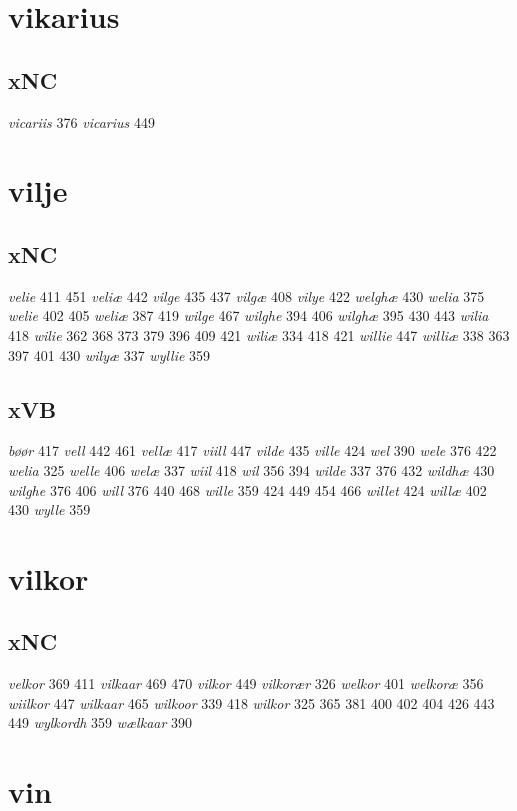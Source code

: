 \documentclass[a4paper,twocolumn]{article}
\begin{document}
\section{vikarius}
\label{sec:org10a47e7}
\subsection{xNC}
\label{sec:org14430ad}
\emph{vicariis} 376 \emph{vicarius} 449 
\section{vilje}
\label{sec:org9600dae}
\subsection{xNC}
\label{sec:orgcb5b769}
\emph{velie} 411 451 \emph{veliæ} 442 \emph{vilge} 435 437 \emph{vilgæ} 408 \emph{vilye} 422 \emph{welghæ} 430 \emph{welia} 375 \emph{welie} 402 405 \emph{weliæ} 387 419 \emph{wilge} 467 \emph{wilghe} 394 406 \emph{wilghæ} 395 430 443 \emph{wilia} 418 \emph{wilie} 362 368 373 379 396 409 421 \emph{wiliæ} 334 418 421 \emph{willie} 447 \emph{williæ} 338 363 397 401 430 \emph{wilyæ} 337 \emph{wyllie} 359 
\subsection{xVB}
\label{sec:org5499669}
\emph{bøør} 417 \emph{vell} 442 461 \emph{vellæ} 417 \emph{viill} 447 \emph{vilde} 435 \emph{ville} 424 \emph{wel} 390 \emph{wele} 376 422 \emph{welia} 325 \emph{welle} 406 \emph{welæ} 337 \emph{wiil} 418 \emph{wil} 356 394 \emph{wilde} 337 376 432 \emph{wildhæ} 430 \emph{wilghe} 376 406 \emph{will} 376 440 468 \emph{wille} 359 424 449 454 466 \emph{willet} 424 \emph{willæ} 402 430 \emph{wylle} 359 
\section{vilkor}
\label{sec:org45bff07}
\subsection{xNC}
\label{sec:orgfae1070}
\emph{velkor} 369 411 \emph{vilkaar} 469 470 \emph{vilkor} 449 \emph{vilkorær} 326 \emph{welkor} 401 \emph{welkoræ} 356 \emph{wiilkor} 447 \emph{wilkaar} 465 \emph{wilkoor} 339 418 \emph{wilkor} 325 365 381 400 402 404 426 443 449 \emph{wylkordh} 359 \emph{wælkaar} 390 
\section{vin}
\label{sec:org38dbcf9}
\end{document}
